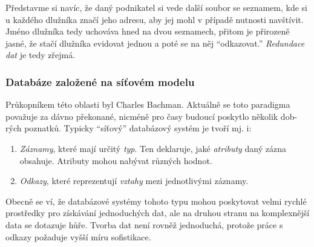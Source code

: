 Představme si navíc, že daný podnikatel si vede další soubor se seznamem, kde si u každého dlužníka značí jeho adresu, aby jej mohl v případě nutnosti navštívit. Jméno dlužníka tedy uchováva hned na dvou seznamech, přitom je přirozeně jasné, že stačí dlužníka evidovat jednou a poté se na něj \enquote{odkazovat.} \textit{Redundace dat} je tedy zřejmá.

\subsubsection{Databáze založené na síťovém modelu}
Průkopníkem této oblasti byl Charles Bachman. Aktuálně se toto paradigma považuje za dávno překonané, nicméně pro časy budoucí poskytlo několik dob-rých poznatků. Typicky \enquote{síťový} databázový systém je tvoří mj. i:
\begin{enumerate}
\item \textit{Záznamy}, které mají určitý \textit{typ}. Ten deklaruje, jaké \textit{atributy} daný zázna obsahuje. Atributy mohou nabývat různých hodnot.
\item \textit{Odkazy}, které reprezentují \textit{vztahy} mezi jednotlivými záznamy.
\end{enumerate}
Obecně se ví, že databázové systémy tohoto typu mohou poskytovat velmi rychlé prostředky pro získávání jednoduchých dat, ale na druhou stranu na komplexnější data se dotazuje hůře. Tvorba dat není rovněž jednoduchá, protože práce s odkazy požaduje vyšší míru sofistikace.

